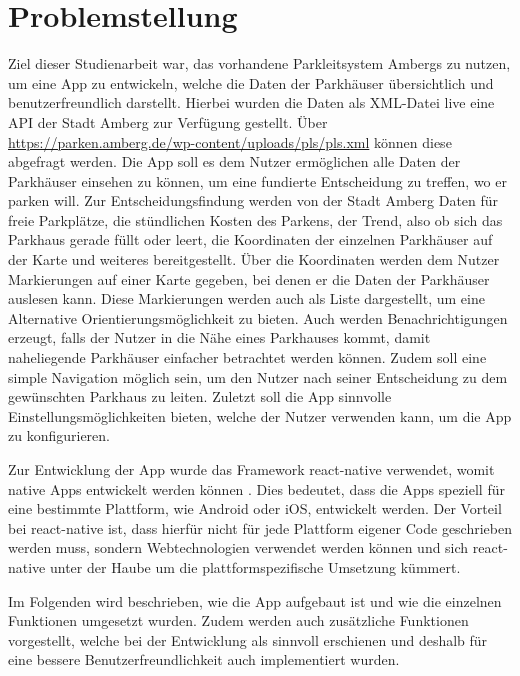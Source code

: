 \chapter{Problemstellung}
\label{chap:1}

Ziel dieser Studienarbeit war, das vorhandene Parkleitsystem Ambergs zu nutzen, um eine App zu entwickeln, welche die Daten der Parkhäuser übersichtlich und benutzerfreundlich darstellt. Hierbei wurden die Daten als XML-Datei live eine API der Stadt Amberg zur Verfügung gestellt. Über \url{https://parken.amberg.de/wp-content/uploads/pls/pls.xml} können diese abgefragt werden. Die App soll es dem Nutzer ermöglichen alle Daten der Parkhäuser einsehen zu können, um eine fundierte Entscheidung zu treffen, wo er parken will. Zur Entscheidungsfindung werden von der Stadt Amberg Daten für freie Parkplätze, die stündlichen Kosten des Parkens, der Trend, also ob sich das Parkhaus gerade füllt oder leert, die Koordinaten der einzelnen Parkhäuser auf der Karte und weiteres bereitgestellt. Über die Koordinaten werden dem Nutzer Markierungen auf einer Karte gegeben, bei denen er die Daten der Parkhäuser auslesen kann. Diese Markierungen werden auch als Liste dargestellt, um eine Alternative Orientierungsmöglichkeit zu bieten. Auch werden Benachrichtigungen erzeugt, falls der Nutzer in die Nähe eines Parkhauses kommt, damit naheliegende Parkhäuser einfacher betrachtet werden können. Zudem soll eine simple Navigation möglich sein, um den Nutzer nach seiner Entscheidung zu dem gewünschten Parkhaus zu leiten. Zuletzt soll die App sinnvolle Einstellungsmöglichkeiten bieten, welche der Nutzer verwenden kann, um die App zu konfigurieren.

Zur Entwicklung der App wurde das Framework react-native verwendet, womit native Apps entwickelt werden können \cite{ReactNative}. Dies bedeutet, dass die Apps speziell für eine bestimmte Plattform, wie Android oder iOS, entwickelt werden. Der Vorteil bei react-native ist, dass hierfür nicht für jede Plattform eigener Code geschrieben werden muss, sondern Webtechnologien verwendet werden können und sich react-native unter der Haube um die plattformspezifische Umsetzung kümmert.

Im Folgenden wird beschrieben, wie die App aufgebaut ist und wie die einzelnen Funktionen umgesetzt wurden. Zudem werden auch zusätzliche Funktionen vorgestellt, welche bei der Entwicklung als sinnvoll erschienen und deshalb für eine bessere Benutzerfreundlichkeit auch implementiert wurden.

